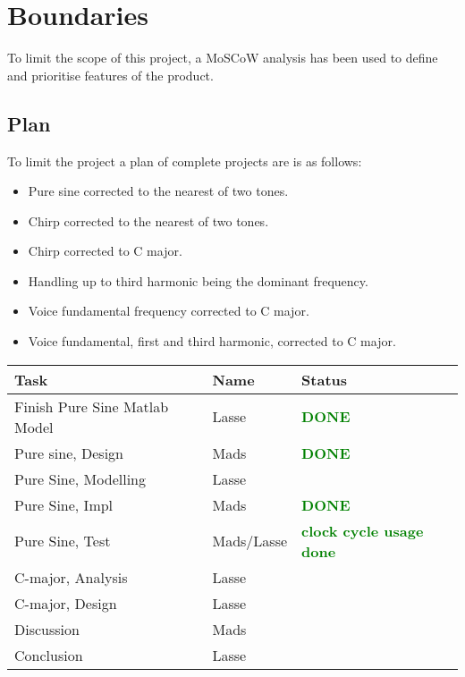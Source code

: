 
\chapter{Boundaries}
\label{sec:Boundaries}
To limit the scope of this project, a MoSCoW analysis has been used to define and prioritise features of the product.

\section{Plan}
To limit the project a plan of complete projects are is as follows:

\begin{itemize}
	\item Pure sine corrected to the nearest of two tones.
	\item Chirp corrected to the nearest of two tones.
	\item Chirp corrected to C major.
	\item Handling up to third harmonic being the dominant frequency.
	\item Voice fundamental frequency corrected to C major.
	\item Voice fundamental, first and third harmonic, corrected to C major.
\end{itemize}

\begin{table}
	\centering
	\begin{tabular}{l l l}
		\toprule
		Task & Name & Status \\
		\midrule
		Finish Pure Sine Matlab Model & Lasse & \textcolor{green}{\textbf{DONE}} \\
		Pure sine, Design & Mads & \textcolor{green}{\textbf{DONE}}\\
		Pure Sine, Modelling & Lasse & \\
		Pure Sine, Impl & Mads & \textcolor{green}{\textbf{DONE}} \\
		Pure Sine, Test & Mads/Lasse & \textcolor{green}{\textbf{clock cycle usage done}}\\
		C-major, Analysis & Lasse & \\
		C-major, Design & Lasse & \\
		Discussion & Mads & \\
		Conclusion & Lasse & \\
		\bottomrule
	\end{tabular}
\end{table}
